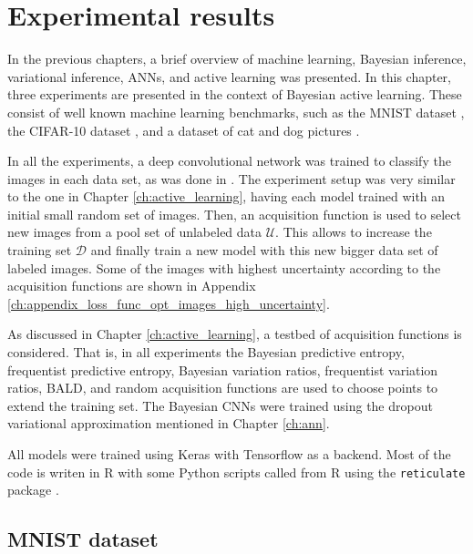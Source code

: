 
\chapter{Experimental results}
\label{ch:results}

In the previous chapters, a brief overview of machine learning, Bayesian inference, variational inference, ANNs, and active learning was presented. In this chapter, three experiments are presented in the context of Bayesian active learning. These consist of well known machine learning benchmarks, such as the MNIST dataset \cite{lecun1998gradient}, the CIFAR-10 dataset \cite{krizhevsky2009learning}, and a dataset of cat and dog pictures \cite{elson2007asirra}.

In all the experiments, a deep convolutional network was trained to classify the images in each data set, as was done in \cite{Gal2016Active}. The experiment setup was very similar to the one in Chapter \ref{ch:active_learning}, having each model trained with an initial small random set of images. Then, an acquisition function is used to select new images from a pool set of unlabeled data $\mathcal{U}$. This allows to increase the training set $\mathcal{D}$ and finally train a new model with this new bigger data set of labeled images. Some of the images with highest uncertainty according to the acquisition functions are shown in Appendix \ref{ch:appendix_loss_func_opt_images_high_uncertainty}.

As discussed in Chapter \ref{ch:active_learning}, a testbed of acquisition functions is considered. That is, in all experiments the Bayesian predictive entropy, frequentist predictive entropy, Bayesian variation ratios, frequentist variation ratios, BALD, and random acquisition functions are used to choose points to extend the training set. The Bayesian CNNs were trained using the dropout variational approximation mentioned in Chapter \ref{ch:ann}.

All models were trained using Keras \cite{chollet2015keras} with Tensorflow \cite{tensorflow2015-whitepaper} as a backend. Most of the code is writen in R with some Python scripts called from R using the \texttt{reticulate} package \cite{reticulate_package}.

\section{MNIST dataset}

